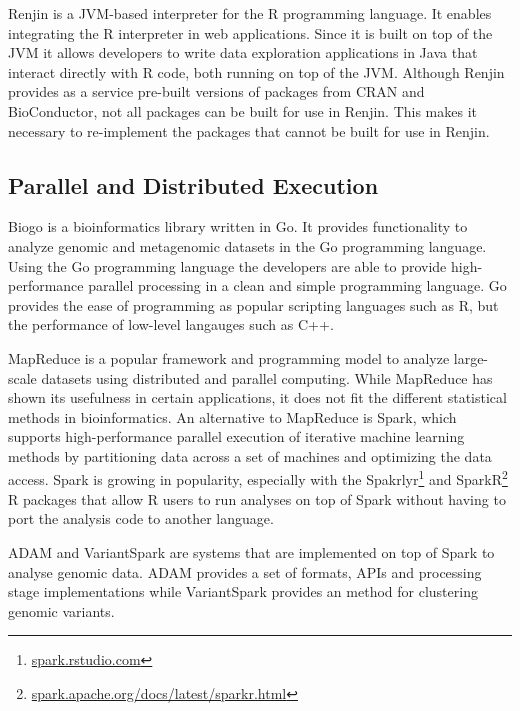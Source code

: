 Renjin is a JVM-based interpreter for the R programming language.\cite{renjin}
It enables integrating the R interpreter in web applications. Since it is built
on top of the JVM it allows developers to write data exploration applications in
Java that interact directly with R code, both running on top of the JVM.
Although Renjin provides as a service pre-built versions of packages from
CRAN and BioConductor, not all packages can be built for use in Renjin. This
makes it necessary to re-implement the packages that cannot be built for use in
Renjin. 

\subsection*{Parallel and Distributed Execution}
Biogo is a bioinformatics library written in Go. It provides functionality to
analyze genomic and metagenomic datasets in the Go programming
language.\cite{biogo} Using the Go programming language the developers
are able to provide high-performance parallel processing in a clean and simple
programming language. Go provides the ease of programming as popular scripting
languages such as R, but the performance of low-level langauges such as C++. 

MapReduce is a popular framework and programming model to analyze large-scale
datasets using distributed and parallel computing.\cite{dean2008mapreduce}
While MapReduce has shown its usefulness in certain applications, it does not
fit the different statistical methods in bioinformatics. 
An alternative to MapReduce is Spark, which supports high-performance parallel
execution of iterative machine learning methods by partitioning data across a set
of machines and optimizing the data access.\cite{zaharia2010spark} Spark is
growing in popularity, especially with the
Spakrlyr\footnote{\url{spark.rstudio.com}} and
SparkR\footnote{\url{spark.apache.org/docs/latest/sparkr.html}} R packages that
allow R users to run analyses on top of Spark without having to port the
analysis code to another language. 

ADAM and VariantSpark are systems that are implemented on top of Spark to
analyse genomic data. ADAM provides a set of formats, APIs and processing stage
implementations \cite{massie2013adam} while VariantSpark provides an method for
clustering genomic variants\cite{o2015variantspark}. 

